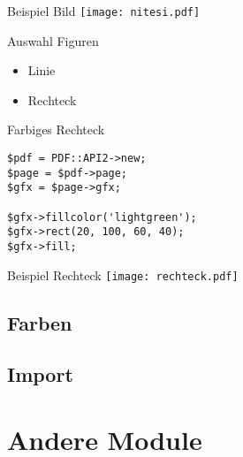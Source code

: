 \begin{frame}{Beispiel Bild}
\texttt{[image: nitesi.pdf]}
\end{frame}

\begin{frame}{Auswahl Figuren}
\begin{itemize}
\item Linie
\item Rechteck
\end{itemize}
\end{frame}

\begin{frame}[fragile]{Farbiges Rechteck}
\begin{lstlisting}
$pdf = PDF::API2->new;
$page = $pdf->page;
$gfx = $page->gfx;

$gfx->fillcolor('lightgreen');
$gfx->rect(20, 100, 60, 40);
$gfx->fill;
\end{lstlisting}
\end{frame}

\begin{frame}{Beispiel Rechteck}
\texttt{[image: rechteck.pdf]}
\end{frame}

\subsection{Farben}

\subsection{Import}



\section{Andere Module}


